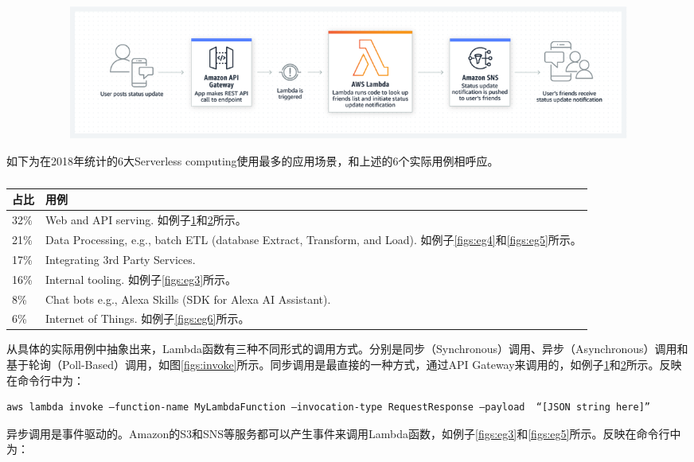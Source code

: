 \documentclass[11pt]{article}
\begin{document}
\begin{figure}[!htbp]
\begin{subfigure}[b]{\linewidth}
		\caption{}
		\label{figs:eg1}
	\end{subfigure}
	\begin{subfigure}[b]{\linewidth}
	\centering
	\includegraphics[width=0.8\linewidth]{figs/eg2}
	\caption{}
	\label{figs:eg2}
	\end{subfigure}
	\caption{}
	\label{}
\end{figure}
如下为\cite{serverless}在2018年统计的6大Serverless computing使用最多的应用场景，和上述的6个实际用例相呼应。
\begin{table}[!htbp]
	\caption{}
	\label{tab:usage}
	\centering
	\footnotesize%
	\setlength{\tabcolsep}{4pt}%
	\renewcommand{\arraystretch}{1.2}%
	\begin{tabular}{ll}
		\hline
		占比 & 用例\\%
		\hline
		32\%   & Web and API serving. 如例子\ref{figs:eg1}和\ref{figs:eg2}所示。\\
		21\%   & Data Processing, e.g., batch ETL (database Extract, Transform, and Load). 如例子\ref{figs:eg4}和\ref{figs:eg5}所示。\\
		17\%   & Integrating 3rd Party Services. \\
		16\%   & Internal tooling. 如例子\ref{figs:eg3}所示。\\
		8\%    & Chat bots e.g., Alexa Skills (SDK for Alexa AI Assistant). \\
		6\%    & Internet of Things. 如例子\ref{figs:eg6}所示。\\
		\hline
	\end{tabular}
\end{table}
从具体的实际用例中抽象出来，Lambda函数有三种不同形式的调用方式。分别是同步（Synchronous）调用、异步（Asynchronous）调用和基于轮询（Poll-Based）调用，如图\ref{figs:invoke}所示。同步调用是最直接的一种方式，通过API Gateway来调用的，如例子\ref{figs:eg1}和\ref{figs:eg2}所示。反映在命令行中为：
\begin{lstlisting}[language=bash]
aws lambda invoke —function-name MyLambdaFunction —invocation-type RequestResponse —payload  “[JSON string here]”
\end{lstlisting}
异步调用是事件驱动的。Amazon的S3和SNS等服务都可以产生事件来调用Lambda函数，如例子\ref{figs:eg3}和\ref{figs:eg5}所示。反映在命令行中为：
\end{document}
